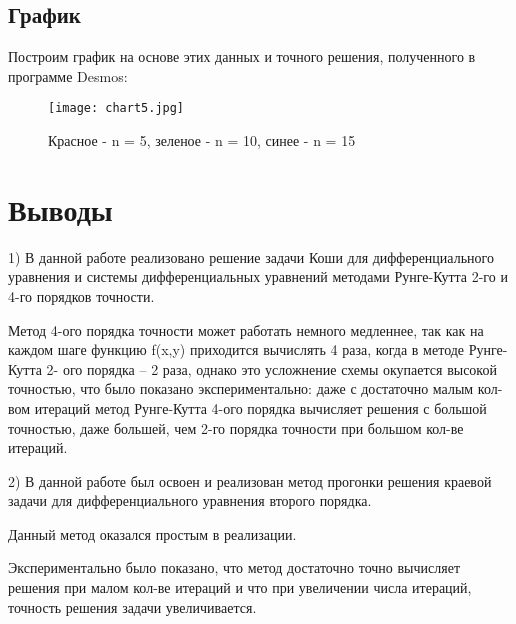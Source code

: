 \documentclass[a4paper,12pt,titlepage,finall]{article}
\begin{document}
\newpage
\subsection{График}

Построим график на основе этих данных и точного решения, полученного в программе Desmos:


\begin{figure}[h!]
\centering
\texttt{[image: chart5.jpg]}
\caption{Красное - n = 5, зеленое - n = 10, синее - n = 15}
\end{figure}


\newpage

\section{Выводы}

1) В данной работе реализовано решение задачи Коши для дифференциального уравнения и системы дифференциальных уравнений методами Рунге-Кутта 2-го и 4-го порядков точности.

Метод 4-ого порядка точности может работать немного медленнее, так как на каждом шаге функцию f(x,y) приходится вычислять 4 раза, когда в методе Рунге-Кутта 2- ого порядка – 2 раза, однако это усложнение схемы окупается высокой точностью, что было показано экспериментально: даже с достаточно малым кол-вом итераций метод Рунге-Кутта 4-ого порядка вычисляет решения с большой точностью, даже большей, чем 2-го порядка точности при большом кол-ве итераций.



2) В данной работе был освоен и реализован метод прогонки решения краевой задачи для дифференциального уравнения второго порядка.

Данный метод оказался простым в реализации.

Экспериментально было показано, что метод достаточно точно вычисляет решения при малом кол-ве итераций и что при увеличении числа итераций, точность решения задачи увеличивается.
\end{document}
